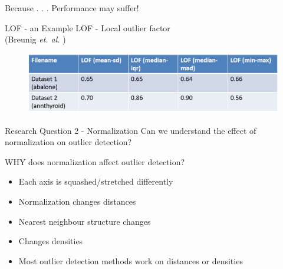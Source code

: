 \documentclass{beamer}
\begin{document}
\begin{darkframes}
	\begin{frame}{Because . . .}
	\centering
	{\Huge Performance may suffer! }
	\end{frame}

	\begin{frame}{LOF - an Example}
	LOF - Local outlier factor \\
	(Breunig {\it et. al. })
	
	\begin{figure}[H]
	\centering
	\includegraphics[scale=0.4]{LOF_Example.png}
	\end{figure}
	\end{frame}
	
	\begin{frame}{Research Question 2 - Normalization}
	 \centering
	  {\huge Can we understand the effect of}\\ \vspace{0.5cm}
	  {\huge normalization on outlier detection?}
	\end{frame}
	
		\begin{frame}[label=figsnorm]
		\begin{figure}[b]
		\centering
	\end{figure}
	
	\end{frame}

	
	\begin{frame}{WHY does normalization affect outlier detection?}
	\begin{itemize}
		\item Each axis is squashed/stretched differently
		\item Normalization changes distances
		\item Nearest neighbour structure changes
		\item Changes densities
		\vspace{1cm}
		\item {\Large Most outlier detection methods work on distances or densities}
		

\end{itemize}
\end{frame}
\end{darkframes}
\end{document}
